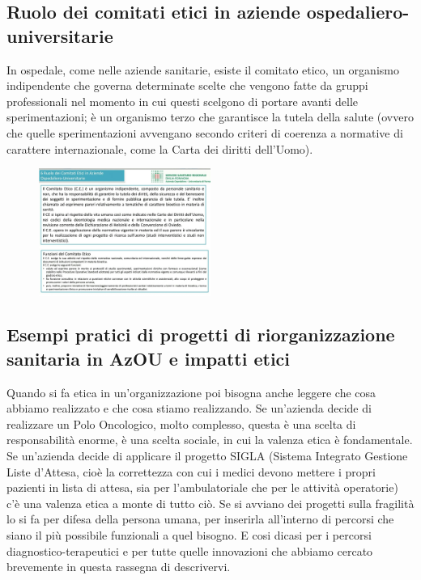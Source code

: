 \subsection{Ruolo dei comitati etici in aziende ospedaliero-universitarie}

In ospedale, come nelle aziende sanitarie, esiste il comitato etico, un
organismo indipendente che governa determinate scelte che vengono fatte
da gruppi professionali nel momento in cui questi scelgono di portare
avanti delle sperimentazioni; è un organismo terzo che garantisce la
tutela della salute (ovvero che quelle sperimentazioni avvengano secondo
criteri di coerenza a normative di carattere internazionale, come la
Carta dei diritti dell'Uomo).

 \begin{figure}[!ht]
\centering
	\includegraphics[width=0.5\textwidth]{32/image22.jpeg}
	\end{figure}

\subsection{Esempi pratici di progetti di riorganizzazione sanitaria in AzOU e impatti etici}

Quando si fa etica in un'organizzazione poi bisogna anche leggere che
cosa abbiamo realizzato e che cosa stiamo realizzando. Se un'azienda
decide di realizzare un Polo Oncologico, molto complesso, questa è una
scelta di responsabilità enorme, è una scelta sociale, in cui la valenza
etica è fondamentale. Se un'azienda decide di applicare il progetto
SIGLA (Sistema Integrato Gestione Liste d'Attesa, cioè la correttezza
con cui i medici devono mettere i propri pazienti in lista di attesa,
sia per l'ambulatoriale che per le attività operatorie) c'è una valenza
etica a monte di tutto ciò. Se si avviano dei progetti sulla fragilità
lo si fa per difesa della persona umana, per inserirla all'interno di
percorsi che siano il più possibile funzionali a quel bisogno. E cosi
dicasi per i percorsi diagnostico-terapeutici e per tutte quelle
innovazioni che abbiamo cercato brevemente in questa rassegna di
descrivervi.

